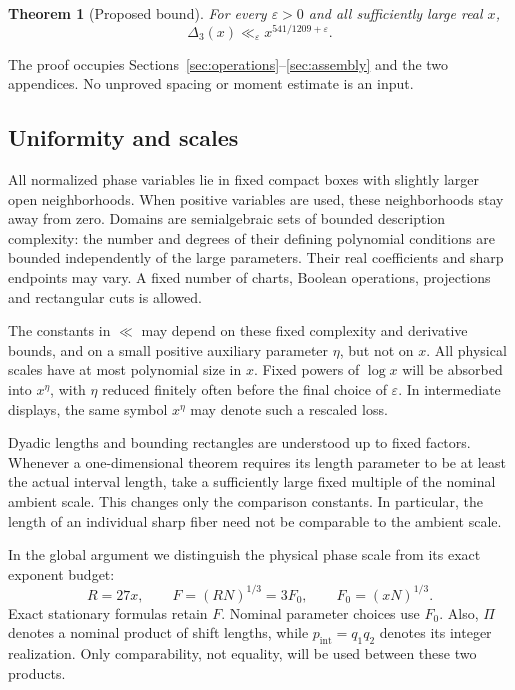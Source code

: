 \documentclass[11pt,a4paper]{article}
\numberwithin{equation}{section}
\newtheorem{theorem}{Theorem}[section]
\theoremstyle{remark}
\newcommand{\eps}{\varepsilon}
\newcommand{\pint}{p_{\mathrm{int}}}
\newcommand{\Fzero}{F_0}
\begin{document}
\begin{theorem}[Proposed bound]\label{thm:main}
For every $\eps>0$ and all sufficiently large real $x$,
\[
 \Delta_3(x)\ll_\eps x^{541/1209+\eps}.
\]
\end{theorem}

The proof occupies Sections~\ref{sec:operations}--\ref{sec:assembly} and the
two appendices. No unproved spacing or moment estimate is an input.

\subsection{Uniformity and scales}
All normalized phase variables lie in fixed compact boxes with slightly larger
open neighborhoods. When positive variables are used, these neighborhoods stay
away from zero. Domains are semialgebraic sets of bounded description
complexity: the number and degrees of their defining polynomial conditions are
bounded independently of the large parameters. Their real coefficients and
sharp endpoints may vary. A fixed number of charts, Boolean operations,
projections and rectangular cuts is allowed.

The constants in $\ll$ may depend on these fixed complexity and derivative
bounds, and on a small positive auxiliary parameter $\eta$, but not on $x$.
All physical scales have at most polynomial size in $x$. Fixed powers of
$\log x$ will be absorbed into $x^\eta$, with $\eta$ reduced finitely often
before the final choice of $\eps$. In intermediate displays, the same symbol
$x^\eta$ may denote such a rescaled loss.

Dyadic lengths and bounding rectangles are understood up to fixed factors.
Whenever a one-dimensional theorem requires its length parameter to be at
least the actual interval length, take a sufficiently large fixed multiple of
the nominal ambient scale. This changes only the comparison constants. In
particular, the length of an individual sharp fiber need not be comparable to
the ambient scale.

In the global argument we distinguish the physical phase scale from its exact
exponent budget:
\begin{equation}\label{eq:F-convention}
 R=27x,\qquad F=(RN)^{1/3}=3\Fzero,
 \qquad \Fzero=(xN)^{1/3}.
\end{equation}
Exact stationary formulas retain $F$. Nominal parameter choices use $\Fzero$.
Also, $\Pi$ denotes a nominal product of shift lengths, while
$\pint=q_1q_2$ denotes its integer realization. Only comparability, not equality,
will be used between these two products.
\end{document}
